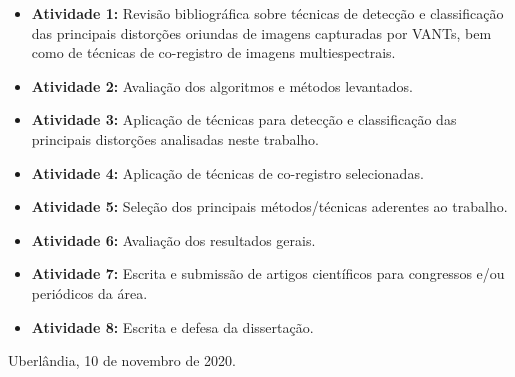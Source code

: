 \documentclass[12pt]{article}
\begin{document}
\begin{itemize}

    \item \textbf{Atividade 1:} Revisão bibliográfica sobre técnicas de detecção e classificação das principais distorções oriundas de imagens capturadas por VANTs, bem como de técnicas de co-registro de imagens multiespectrais.
    \item \textbf{Atividade 2:} Avaliação dos algoritmos e métodos levantados.
    \item \textbf{Atividade 3:} Aplicação de técnicas para detecção e classificação das principais distorções analisadas neste trabalho.
    \item \textbf{Atividade 4:} Aplicação de técnicas de co-registro selecionadas.
    \item \textbf{Atividade 5:} Seleção dos principais métodos/técnicas aderentes ao trabalho.
    \item \textbf{Atividade 6:} Avaliação dos resultados gerais.
    \item \textbf{Atividade 7:} Escrita e submissão de artigos científicos para congressos e/ou periódicos da área.
    \item \textbf{Atividade 8:} Escrita e defesa da dissertação.
    
\end{itemize}

\noindent Uberlândia, 10 de novembro de 2020.


\end{document}
